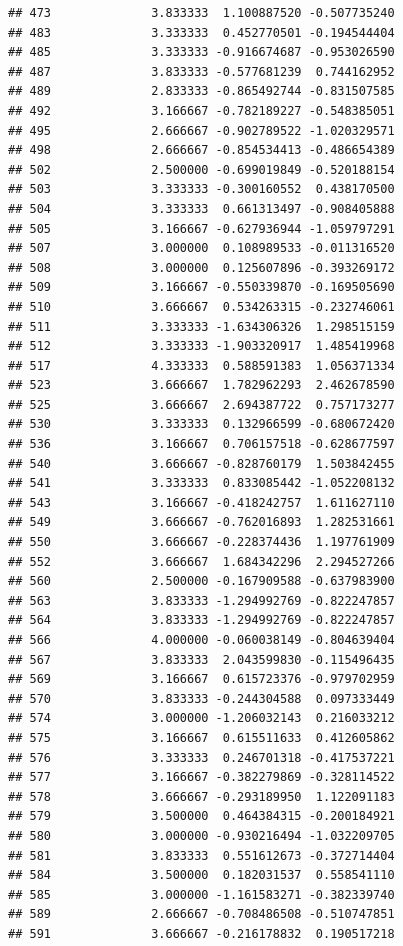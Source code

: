 \documentclass[
]{article}
\begin{document}
\begin{verbatim}
## 473              3.833333  1.100887520 -0.507735240
## 483              3.333333  0.452770501 -0.194544404
## 485              3.333333 -0.916674687 -0.953026590
## 487              3.833333 -0.577681239  0.744162952
## 489              2.833333 -0.865492744 -0.831507585
## 492              3.166667 -0.782189227 -0.548385051
## 495              2.666667 -0.902789522 -1.020329571
## 498              2.666667 -0.854534413 -0.486654389
## 502              2.500000 -0.699019849 -0.520188154
## 503              3.333333 -0.300160552  0.438170500
## 504              3.333333  0.661313497 -0.908405888
## 505              3.166667 -0.627936944 -1.059797291
## 507              3.000000  0.108989533 -0.011316520
## 508              3.000000  0.125607896 -0.393269172
## 509              3.166667 -0.550339870 -0.169505690
## 510              3.666667  0.534263315 -0.232746061
## 511              3.333333 -1.634306326  1.298515159
## 512              3.333333 -1.903320917  1.485419968
## 517              4.333333  0.588591383  1.056371334
## 523              3.666667  1.782962293  2.462678590
## 525              3.666667  2.694387722  0.757173277
## 530              3.333333  0.132966599 -0.680672420
## 536              3.166667  0.706157518 -0.628677597
## 540              3.666667 -0.828760179  1.503842455
## 541              3.333333  0.833085442 -1.052208132
## 543              3.166667 -0.418242757  1.611627110
## 549              3.666667 -0.762016893  1.282531661
## 550              3.666667 -0.228374436  1.197761909
## 552              3.666667  1.684342296  2.294527266
## 560              2.500000 -0.167909588 -0.637983900
## 563              3.833333 -1.294992769 -0.822247857
## 564              3.833333 -1.294992769 -0.822247857
## 566              4.000000 -0.060038149 -0.804639404
## 567              3.833333  2.043599830 -0.115496435
## 569              3.166667  0.615723376 -0.979702959
## 570              3.833333 -0.244304588  0.097333449
## 574              3.000000 -1.206032143  0.216033212
## 575              3.166667  0.615511633  0.412605862
## 576              3.333333  0.246701318 -0.417537221
## 577              3.166667 -0.382279869 -0.328114522
## 578              3.666667 -0.293189950  1.122091183
## 579              3.500000  0.464384315 -0.200184921
## 580              3.000000 -0.930216494 -1.032209705
## 581              3.833333  0.551612673 -0.372714404
## 584              3.500000  0.182031537  0.558541110
## 585              3.000000 -1.161583271 -0.382339740
## 589              2.666667 -0.708486508 -0.510747851
## 591              3.666667 -0.216178832  0.190517218

\end{verbatim}
\end{document}
